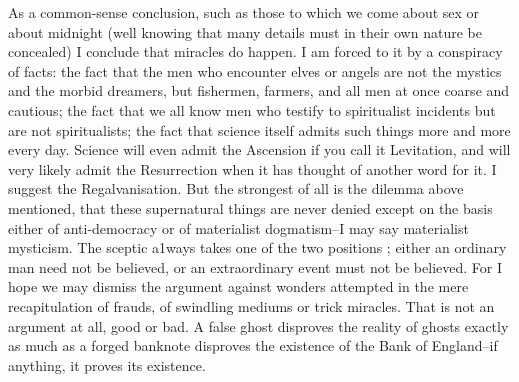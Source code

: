 \documentclass{book}
\begin{document}
As a common-sense conclusion, such as those to which we come about sex or about midnight (well knowing that many details must in their own nature be concealed) I conclude that miracles do happen. I am forced to it by a conspiracy of facts: the fact that the men who encounter elves or angels are not the mystics and the morbid dreamers, but fishermen, farmers, and all men at once coarse and cautious; the fact that we all know men who testify to spiritualist incidents but are not spiritualists; the fact that science itself admits such things more and more every day. Science will even admit the Ascension if you call it Levitation, and will very likely admit the Resurrection when it has thought of another word for it. I suggest the Regalvanisation. But the strongest of all is the dilemma above mentioned, that these supernatural things are never denied except on the basis either of anti-democracy or of materialist dogmatism–I may say materialist mysticism. The sceptic a1ways takes one of the two positions ; either an ordinary man need not be believed, or an extraordinary event must not be believed. For I hope we may dismiss the argument against wonders attempted in the mere recapitulation of frauds, of swindling mediums or trick miracles. That is not an argument at all, good or bad. A false ghost disproves the reality of ghosts exactly as much as a forged banknote disproves the existence of the Bank of England–if anything, it proves its existence.
\end{document}
